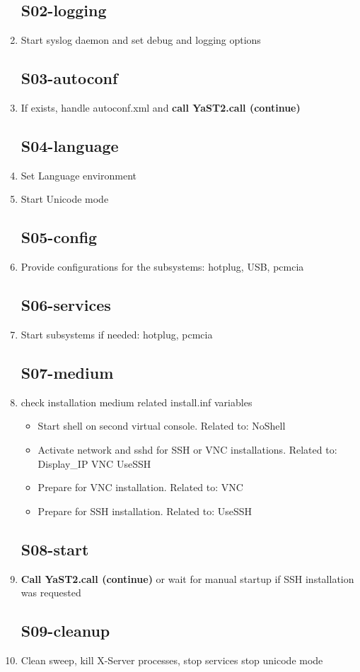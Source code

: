\begin{enumerate}
\subsection{S02-logging}
\item Start syslog daemon and set debug and logging options
\subsection{S03-autoconf}
\item If exists, handle autoconf.xml and \textbf{call YaST2.call (continue)}
\subsection{S04-language}
\item Set Language environment
\item Start Unicode mode
\subsection{S05-config}
\item Provide configurations for the subsystems: hotplug, USB, pcmcia
\subsection{S06-services}
\item Start subsystems if needed: hotplug, pcmcia
\subsection{S07-medium}
\item check installation medium related install.inf variables
\begin{itemize}
      \item Start shell on second virtual console. Related to:
            NoShell
      \item Activate network and sshd for SSH or VNC installations.
            Related to: Display\_IP VNC UseSSH
      \item Prepare for VNC installation. Related to: VNC
      \item Prepare for SSH installation. Related to: UseSSH
\end{itemize}
\subsection{S08-start}
\item \textbf{Call YaST2.call (continue)} or wait for manual
      startup if SSH installation was requested
\subsection{S09-cleanup}
\item Clean sweep, kill X-Server processes, stop services
      stop unicode mode
\end{enumerate}
